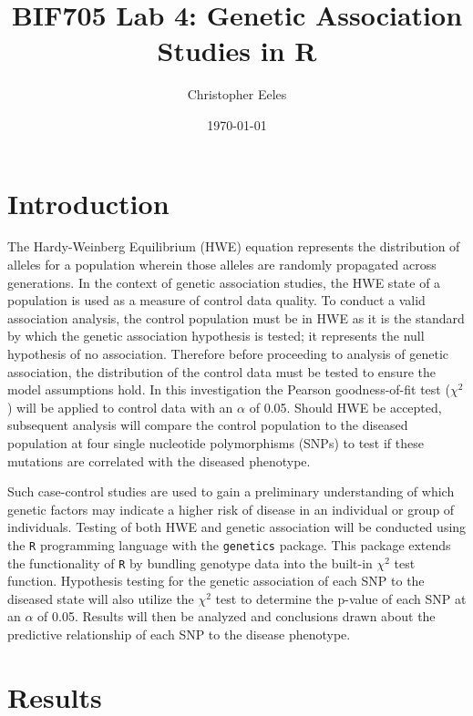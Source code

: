 \documentclass[11 pt,letterpaper]{article}
\title{\LARGE \bf
    BIF705 Lab 4: Genetic Association Studies in R
    }
\author{Christopher Eeles}
\date{\small \today}
\begin{document}
\maketitle

\section{Introduction}

    The Hardy-Weinberg Equilibrium (HWE) equation represents the distribution of alleles for a population wherein those alleles are randomly propagated across generations.\autocite{1}
    In the context of genetic association studies, the HWE state of a population is used as a measure of control data quality.\autocite{1}
    To conduct a valid association analysis, the control population must be in HWE as it is the standard by which the genetic association hypothesis is tested; it represents the null hypothesis of no association.\autocite{1}
    Therefore before proceeding to analysis of genetic association, the distribution of the control data must be tested to ensure the model assumptions hold.\autocite{1}
    In this investigation the Pearson goodness-of-fit test ($\chi^2$) will be applied to control data with an $\alpha$ of 0.05.
    Should HWE be accepted, subsequent analysis will compare the control population to the diseased population at four single nucleotide polymorphisms (SNPs) to test if these mutations are correlated with the diseased phenotype.\autocite{2} 

    Such case-control studies are used to gain a preliminary understanding of which genetic factors may indicate a higher risk of disease in an individual or group of individuals.\autocite{1}
    Testing of both HWE and genetic association will be conducted using the \texttt{R} programming language with the \texttt{genetics} package. 
    This package extends the functionality of \texttt{R} by bundling genotype data into the built-in $\chi^2$ test function.\autocite{3}
    Hypothesis testing for the genetic association of each SNP to the diseased state will also utilize the $\chi^2$ test to determine the p-value of each SNP at an $\alpha$ of 0.05.
    Results will then be analyzed and conclusions drawn about the predictive relationship of each SNP to the disease phenotype.

\section{Results}
\end{document}
